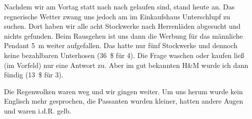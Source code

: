 Nachdem wir am Vortag statt nach  nach  gelaufen sind, stand heute  an.
Das regnerische Wetter zwang uns jedoch am  im Einkaufshaus  Unterschlupf zu suchen.
Dort haben wir alle acht Stockwerke nach Herrenläden abgesucht und nichts gefunden.
Beim Rausgehen ist uns dann die Werbung für das männliche Pendant 5~m weiter aufgefallen.
Das hatte nur fünf Stockwerke und dennoch keine bezahlbaren Unterhosen (36~\$ für 4).
Die Frage waschen oder kaufen ließ (im Vorfeld) nur eine Antwort zu.
Aber im gut bekannten H\&M wurde ich dann fündig (13~\$ für 3).

Die Regenwolken waren weg und wir gingen weiter.
Um uns herum wurde kein Englisch mehr gesprochen, die Passanten wurden kleiner, hatten andere Augen und waren i.d.R. gelb.